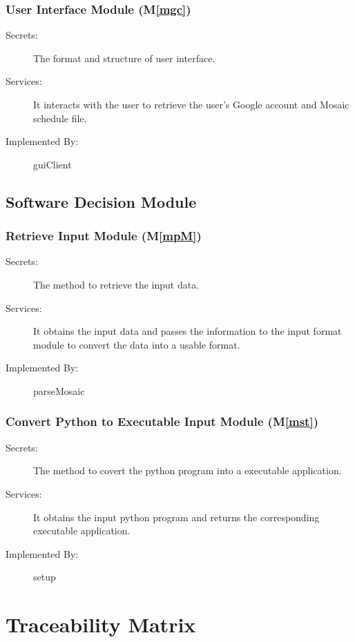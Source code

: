 \documentclass[12pt, titlepage]{article}
\newcommand{\mref}[1]{M\ref{#1}}
\begin{document}
\subsubsection{User Interface Module (\mref{mgc})}
\begin{description}
\item[Secrets:]The format and structure of user interface.
\item[Services:]It interacts with the user to retrieve the user's Google account and Mosaic schedule file.
\item[Implemented By:] guiClient
\end{description}

\subsection{Software Decision Module}
\subsubsection{Retrieve Input Module (\mref{mpM})}
\begin{description}
\item[Secrets:]The method to retrieve the input data.
\item[Services:]It obtains the input data and passes the information to the input format module to convert the data into a usable format.
\item[Implemented By:] parseMosaic
\end{description}

\color{blue}
\subsubsection{Convert Python to Executable Input Module (\mref{mst})}
\begin{description}
\item[Secrets:]The method to covert the python program into a executable application.
\item[Services:]It obtains the input python program and returns the corresponding executable application.
\item[Implemented By:] setup
\end{description}
\color{black}

\section{Traceability Matrix} \label{SecTM}
\end{document}
